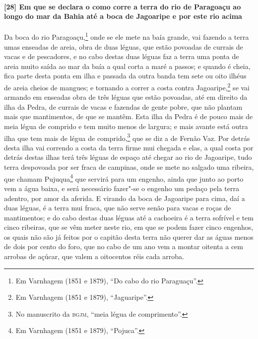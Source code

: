 \paragraph{[28] Em que se declara o como corre a terra do rio de Paragoaçu ao longo do mar
da Bahia até a boca de Jagoaripe e por este rio acima}\quad
Da boca do rio Paragoaçu,\footnote{ Em Varnhagem (1851 e 1879), ``Do cabo do rio
Paraguaçu''.} onde se ele mete na baía grande, vai fazendo a terra umas enseadas de areia,
obra de duas léguas, que estão povoadas de currais de vacas e de pescadores, e no cabo
destas duas léguas faz a terra uma ponta de areia muito saída ao mar da baía a qual corta
a maré a passos; e quando é cheia, fica parte desta ponta em ilha e passada da outra banda
tem sete ou oito ilhéus de areia cheios de mangues; e tornando a correr a costa contra
Jagoaripe,\footnote{ Em Varnhagem (1851 e 1879), ``Jaguaripe''.} se vai armando em
enseadas obra de três léguas que estão povoadas, até em direito da ilha da Pedra, de
currais de vacas e fazendas de gente pobre, que não plantam mais que mantimentos, de que
se mantêm. Esta ilha da Pedra é de pouco mais de meia légua de comprido e tem muito menos
de largura; e mais avante está outra ilha que tem mais de légua de comprido,\footnote{ No
manuscrito da \textsc{bgjm}, ``meia légua de comprimento''.} que se diz a de Fernão Vaz.
Por detrás desta ilha vai correndo a costa da terra firme mui chegada e elas, a qual costa
por detrás destas ilhas terá três léguas de espaço até chegar ao rio de Jagoaripe, tudo
terra despovoada por ser fraca de campinas, onde se mete no salgado uma ribeira, que
chamam Pujuqua\footnote{ Em Varnhagem (1851 e 1879), ``Pojuca''.} que servirá para um
engenho, ainda que junto ao porto vem a água baixa, e será necessário fazer"-se o engenho
um pedaço pela terra adentro, por amor da aferida. E virando da boca de Jagoaripe para
cima, daí a duas léguas, é a terra mui fraca, que não serve senão para vacas e roças de
mantimentos; e do cabo destas duas léguas até a cachoeira é a terra sofrível e tem cinco
ribeiras, que se vêm meter neste rio, em que se podem fazer cinco engenhos, os quais não
são já feitos por o capitão desta terra não querer dar as águas menos de dois por cento do
foro, que no cabo de um ano vem a montar oitenta a cem arrobas de açúcar, que valem a
oitocentos réis cada arroba.

